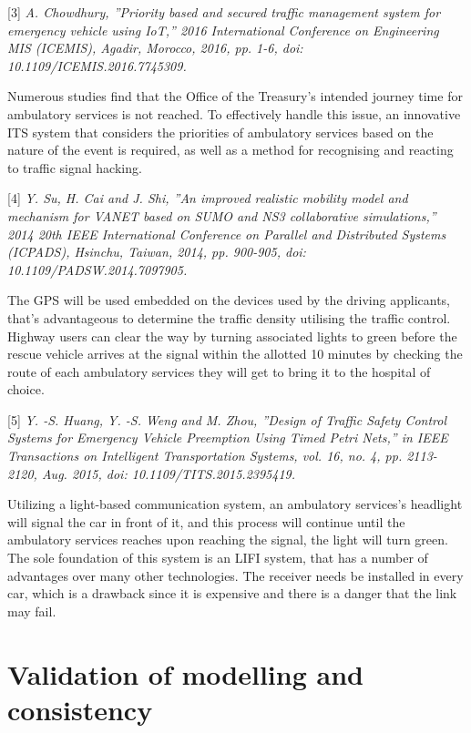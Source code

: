 \documentclass[conference]{IEEEtran}
\begin{document}
[3]\emph{ A. Chowdhury, ”Priority based and secured traffic management system for emergency vehicle using IoT,” 2016 International Conference on Engineering MIS (ICEMIS), Agadir,
Morocco, 2016, pp. 1-6, doi: 10.1109/ICEMIS.2016.7745309.}

Numerous studies find that the Office of the Treasury's intended journey time for ambulatory services is not reached. To effectively handle this issue, an innovative ITS system that considers the priorities of ambulatory services based on the nature of the event is required, as well as a method for recognising and reacting to traffic signal hacking.

[4]\emph{ Y. Su, H. Cai and J. Shi, ”An improved realistic mobility model and mechanism for VANET based on
SUMO and NS3 collaborative simulations,” 2014 20th IEEE
International Conference on Parallel and Distributed Systems (ICPADS), Hsinchu, Taiwan, 2014, pp. 900-905, doi:
10.1109/PADSW.2014.7097905. }

The GPS will be used embedded on the devices used by the driving applicants, that's advantageous to determine the traffic density utilising the traffic control. Highway users can clear the way by turning associated lights to green before the rescue vehicle arrives at the signal within the allotted 10 minutes by checking the route of each ambulatory services they will get to bring it to the hospital of choice.


[5]\emph{ Y. -S. Huang, Y. -S. Weng and M. Zhou, ”Design of Traffic Safety Control Systems for Emergency Vehicle Preemption
Using Timed Petri Nets,” in IEEE Transactions on Intelligent
Transportation Systems, vol. 16, no. 4, pp. 2113-2120, Aug.
2015, doi: 10.1109/TITS.2015.2395419.}

Utilizing a light-based communication system, an ambulatory services's headlight will signal the car in front of it, and this process will continue until the ambulatory services reaches upon reaching the signal, the light will turn green. The sole foundation of this system is an LIFI system, that has a number of advantages over many other technologies.
The receiver needs be installed in every car, which is a drawback since it is expensive and there is a danger that the link may fail.


\section{Validation of modelling and consistency }
\end{document}
